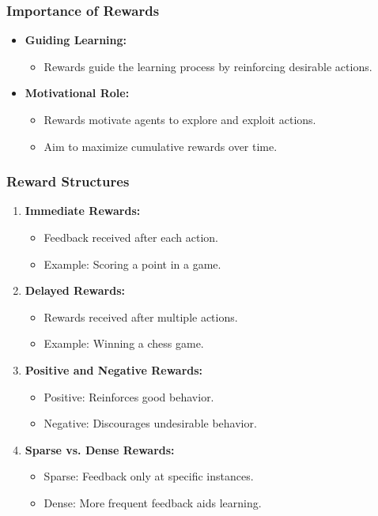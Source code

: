 \documentclass{beamer}
\begin{document}
\begin{frame}[fragile]
    \frametitle{Importance of Rewards}
    \begin{itemize}
        \item \textbf{Guiding Learning:} 
        \begin{itemize}
            \item Rewards guide the learning process by reinforcing desirable actions.
        \end{itemize}
        \item \textbf{Motivational Role:}
        \begin{itemize}
            \item Rewards motivate agents to explore and exploit actions. 
            \item Aim to maximize cumulative rewards over time.
        \end{itemize}
    \end{itemize}
\end{frame}

\begin{frame}[fragile]
    \frametitle{Reward Structures}
    \begin{enumerate}
        \item \textbf{Immediate Rewards:}
            \begin{itemize}
                \item Feedback received after each action.
                \item Example: Scoring a point in a game.
            \end{itemize}
        \item \textbf{Delayed Rewards:}
            \begin{itemize}
                \item Rewards received after multiple actions.
                \item Example: Winning a chess game.
            \end{itemize}
        \item \textbf{Positive and Negative Rewards:}
            \begin{itemize}
                \item Positive: Reinforces good behavior.
                \item Negative: Discourages undesirable behavior.
            \end{itemize}
        \item \textbf{Sparse vs. Dense Rewards:}
            \begin{itemize}
                \item Sparse: Feedback only at specific instances.
                \item Dense: More frequent feedback aids learning.
            \end{itemize}
    \end{enumerate}
\end{frame}
\end{document}
